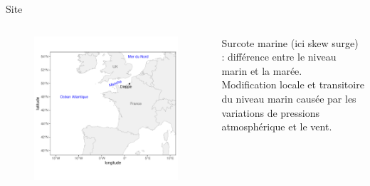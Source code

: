 \documentclass[aspectratio=169]{beamer}
\begin{document}
\begin{frame}{Site}
\begin{columns}
	\begin{column}{0.7\textwidth}
	\vspace{-1.2cm}
	\begin{figure}
	 		\includegraphics[height=1.1\textheight, center]{../figures/map.pdf}
	\end{figure}
	\end{column}
	\begin{column}{0.3\textwidth}
	Surcote marine (ici skew surge) : différence entre le niveau marin et la marée.
	\vspace{0.5cm} \\
	Modification locale et transitoire du niveau marin causée par les variations de pressions atmosphérique et le vent.
	\end{column}
\end{columns}
\end{frame}
\end{document}
